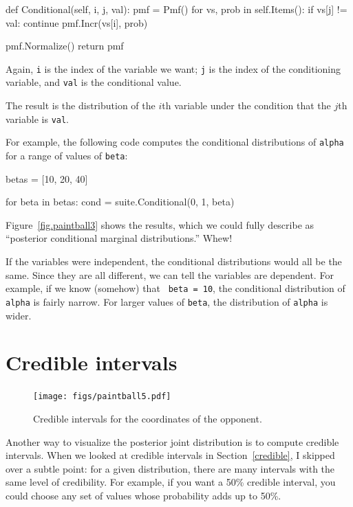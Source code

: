 \documentclass[12pt]{book}
\theoremstyle{exercise}
\begin{document}
\begin{code}
    def Conditional(self, i, j, val):
        pmf = Pmf()
        for vs, prob in self.Items():
            if vs[j] != val: continue
            pmf.Incr(vs[i], prob)

        pmf.Normalize()
        return pmf
\end{code}

Again, {\tt i} is the index of the variable we want; {\tt j}
is the index of the conditioning variable, and {\tt val} is the
conditional value.

The result is the distribution of the $i$th variable under the
condition that the $j$th variable is {\tt val}.

For example, the following code computes the conditional distributions
of {\tt alpha} for a range of values of {\tt beta}:

\begin{code}
    betas = [10, 20, 40]

    for beta in betas:
        cond = suite.Conditional(0, 1, beta)
\end{code}

Figure~\ref{fig.paintball3} shows the results, which we could
fully describe as ``posterior conditional marginal distributions.''
Whew!

If the variables were independent, the conditional distributions would
all be the same.  Since they are all different, we can tell the
variables are dependent.  For example, if we know (somehow) that {\tt
  beta = 10}, the conditional distribution of {\tt alpha} is fairly
narrow.  For larger values of {\tt beta}, the distribution of
{\tt alpha} is wider.


\section{Credible intervals}

\begin{figure}
\centerline{\texttt{[image: figs/paintball5.pdf]}}
\caption{Credible intervals for the coordinates of the opponent.}
\label{fig.paintball5}
\end{figure}

Another way to visualize the posterior joint distribution is to
compute credible intervals.  When we looked at credible intervals
in Section~\ref{credible},
I skipped over a subtle point: for a given distribution, there
are many intervals with the same level of credibility.  For example,
if you want a 50\% credible interval, you could choose any set of
values whose probability adds up to 50\%.
\end{document}
